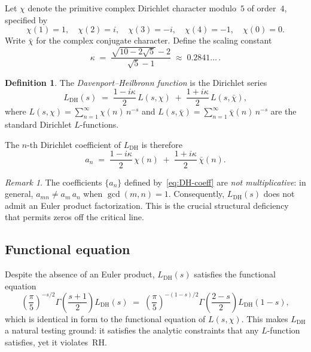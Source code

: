 \documentclass[11pt]{amsart}
\theoremstyle{definition}
\newtheorem{definition}[theorem]{Definition}
\theoremstyle{remark}
\newtheorem{remark}[theorem]{Remark}
\renewcommand{\DH}{\mathrm{DH}}
\begin{document}
Let $\chi$ denote the primitive complex Dirichlet character
modulo~$5$ of order~$4$, specified by
\begin{equation}\label{eq:chi-values}
  \chi(1) = 1, \quad
  \chi(2) = i, \quad
  \chi(3) = -i, \quad
  \chi(4) = -1, \quad
  \chi(0) = 0.
\end{equation}
Write $\bar\chi$ for the complex conjugate character.  Define the
scaling constant
\begin{equation}\label{eq:kappa}
  \kappa \;=\; \frac{\sqrt{10-2\sqrt{5}}-2}{\sqrt{5}-1}
  \;\approx\; 0.2841\ldots\,.
\end{equation}

\begin{definition}\label{def:DH}
The \emph{Davenport--Heilbronn function} is the Dirichlet series
\begin{equation}\label{eq:LDH}
  L_{\DH}(s) \;=\;
  \frac{1-i\kappa}{2}\, L(s,\chi)
  \;+\;
  \frac{1+i\kappa}{2}\, L(s,\bar\chi),
\end{equation}
where $L(s,\chi) = \sum_{n=1}^{\infty} \chi(n)\, n^{-s}$ and
$L(s,\bar\chi) = \sum_{n=1}^{\infty} \bar\chi(n)\, n^{-s}$ are the
standard Dirichlet $L$-functions.
\end{definition}

The $n$-th Dirichlet coefficient of $L_{\DH}$ is therefore
\begin{equation}\label{eq:DH-coeff}
  a_n \;=\; \frac{1-i\kappa}{2}\,\chi(n)
  \;+\; \frac{1+i\kappa}{2}\,\bar\chi(n).
\end{equation}

\begin{remark}\label{rem:not-multiplicative}
The coefficients $\{a_n\}$ defined by~\eqref{eq:DH-coeff} are
\emph{not multiplicative}: in general,
$a_{mn} \neq a_m \, a_n$ when $\gcd(m,n)=1$.  Consequently,
$L_{\DH}(s)$ does not admit an Euler product factorization.  This is
the crucial structural deficiency that permits zeros off the critical
line.
\end{remark}

\subsection{Functional equation}

Despite the absence of an Euler product, $L_{\DH}(s)$ satisfies the
functional equation
\begin{equation}\label{eq:func-eq}
  \left(\frac{\pi}{5}\right)^{-s/2}
  \Gamma\!\left(\frac{s+1}{2}\right) L_{\DH}(s)
  \;=\;
  \left(\frac{\pi}{5}\right)^{-(1-s)/2}
  \Gamma\!\left(\frac{2-s}{2}\right) L_{\DH}(1-s),
\end{equation}
which is identical in form to the functional equation of
$L(s,\chi)$.  This makes $L_{\DH}$ a natural testing ground: it
satisfies the analytic constraints that any $L$-function satisfies,
yet it violates~RH.
\end{document}
